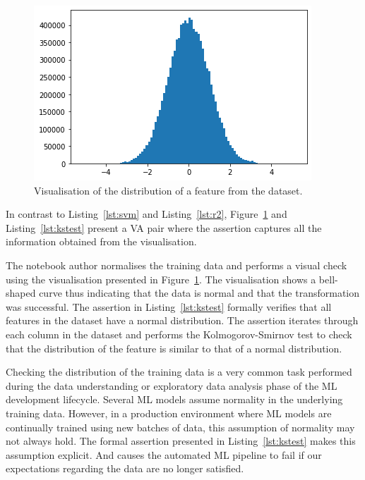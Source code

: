 \begin{figure}
  \includegraphics[width=\linewidth]{../catalogue/select-152a.png}
  \caption{Visualisation of the distribution of a feature from the dataset.}\label{fig:kstest}
\end{figure}

In contrast to Listing~\ref{lst:svm} and Listing~\ref{lst:r2}, Figure~\ref{fig:kstest} and Listing~\ref{lst:kstest} present a VA pair where the assertion captures all the information obtained from the visualisation.

The notebook author normalises the training data and performs a visual check using the visualisation presented in Figure~\ref{fig:kstest}. The visualisation shows a bell-shaped curve thus indicating that the data is normal and that the transformation was successful. The assertion in Listing~\ref{lst:kstest} formally verifies that all features in the dataset have a normal distribution. The assertion iterates through each column in the dataset and performs the Kolmogorov-Smirnov test to check that the distribution of the feature is similar to that of a normal distribution.

Checking the distribution of the training data is a very common task performed during the data understanding or exploratory data analysis phase of the ML development lifecycle. Several ML models assume normality in the underlying training data. However, in a production environment where ML models are continually trained using new batches of data, this assumption of normality may not always hold. The formal assertion presented in Listing~\ref{lst:kstest} makes this assumption explicit. And causes the automated ML pipeline to fail if our expectations regarding the data are no longer satisfied.

